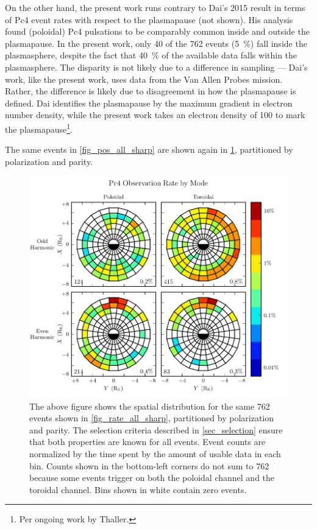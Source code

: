 On the other hand, the present work runs contrary to Dai's 2015 result in terms of Pc4 event rates with respect to the plasmapause (not shown). His analysis found (poloidal) Pc4 pulsations to be comparably common inside and outside the plasmapause\cite{dai_2015}. In the present work, only 40 of the 762 events (\SI{5}{\percent}) fall inside the plasmasphere, despite the fact that \SI{40}{\percent} of the available data falls within the plasmasphere. The disparity is not likely due to a difference in sampling --- Dai's work, like the present work, uses data from the Van Allen Probes mission. Rather, the difference is likely due to disagreement in how the plasmapause is defined. Dai identifies the plasmapause by the maximum gradient in electron number density, while the present work takes an electron density of \SI{100}{\percc} to mark the plasmapause\footnote{Per ongoing work by Thaller. }. 

The same events in \cref{fig_pos_all_sharp} are shown again in \cref{fig_mode_all_sharp}, partitioned by polarization and parity. 

\begin{figure}[!htb]
    \centering
    \includegraphics[width=\textwidth]{figures/mode_all_sharp.pdf}
    \caption[Rate of Pc4 Events by Mode]{
      The above figure shows the spatial distribution for the same 762 events shown in \cref{fig_rate_all_sharp}, partitioned by polarization and parity. The selection criteria described in \cref{sec_selection} ensure that both properties are known for all events. Event counts are normalized by the time spent by the amount of usable data in each bin. Counts shown in the bottom-left corners do not sum to 762 because some events trigger on both the poloidal channel and the toroidal channel. Bins shown in white contain zero events. 
    }
    \label{fig_mode_all_sharp}
\end{figure}

